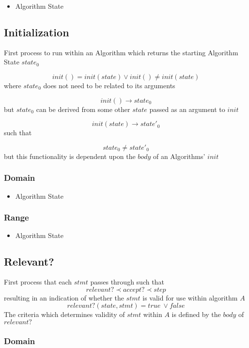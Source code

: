 \documentclass[../main.tex]{subfiles}
\begin{document}
\begin{itemize}
\item Algorithm State
\end{itemize}

\subsection{Initialization}

First process to run within an Algorithm which returns the starting Algorithm State $state_{0}$

$$ init() = init(state) \lor init() \not= init(state)$$
where $state_{0}$ does not need to be related to its arguments

$$init() \to state_{0}$$
but $state_{0}$ can be derived from some other $state$ passed as an argument to $init$

$$init(state) \to state'_{0}$$
such that

$$state_{0} \not= state'_{0} $$
but this functionality is dependent upon the $body$ of an Algorithms' $init$

\subsubsection{Domain}

\begin{itemize}
\item Algorithm State
\end{itemize}

\subsubsection{Range}

\begin{itemize}
\item Algorithm State
\end{itemize}

\subsection{Relevant?}

First process that each $stmt$ passes through such that
$$relevant? \prec accept? \prec step$$
resulting in an indication of whether the $stmt$ is valid for use within algorithm $A$
$$relevant?(state, stmt) = true \ \lor false$$
The criteria which determines validity of $stmt$ within $A$ is defined by the $body$ of $relevant?$

\subsubsection{Domain}
\end{document}

